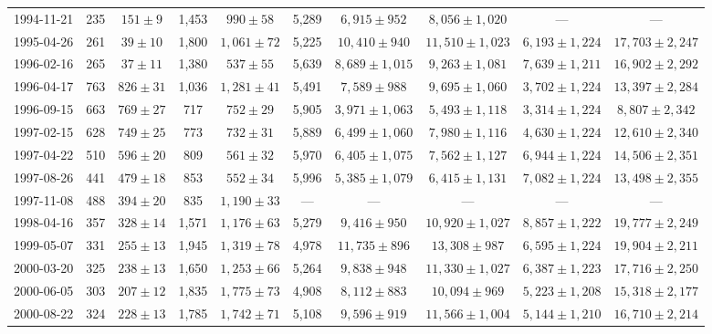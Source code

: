 \begin{landscape}
\begin{longtable}{cccccccccc}
{1994-11-21} & 235 & {$151  \pm  9$} & 1,453 & {$990 \pm 58$} & 5,289 & {$6,915 \pm 952$} & {$8,056 \pm 1,020$} & --- & --- \\
{1995-04-26} & 261 & {$39  \pm  10$} & 1,800 & {$1,061 \pm 72$} & 5,225 & {$10,410 \pm 940$} & {$11,510 \pm 1,023$} & {$6,193 \pm 1,224$} & {$17,703 \pm 2,247$} \\
{1996-02-16} & 265 & {$37  \pm  11$} & 1,380 & {$537 \pm 55$} & 5,639 & {$8,689 \pm 1,015$} & {$9,263 \pm 1,081$} & {$7,639 \pm 1,211$} & {$16,902 \pm 2,292$} \\
{1996-04-17} & 763 & {$826  \pm  31$} & 1,036 & {$1,281 \pm 41$} & 5,491 & {$7,589 \pm 988$} & {$9,695 \pm 1,060$} & {$3,702 \pm 1,224$} & {$13,397 \pm 2,284$} \\
{1996-09-15} & 663 & {$769  \pm  27$} & 717 & {$752 \pm 29$} & 5,905 & {$3,971 \pm 1,063$} & {$5,493 \pm 1,118$} & {$3,314 \pm 1,224$} & {$8,807 \pm 2,342$} \\
{1997-02-15} & 628 & {$749  \pm  25$} & 773 & {$732 \pm 31$} & 5,889 & {$6,499 \pm 1,060$} & {$7,980 \pm 1,116$} & {$4,630 \pm 1,224$} & {$12,610 \pm 2,340$} \\
{1997-04-22} & 510 & {$596  \pm  20$} & 809 & {$561 \pm 32$} & 5,970 & {$6,405 \pm 1,075$} & {$7,562 \pm 1,127$} & {$6,944 \pm 1,224$} & {$14,506 \pm 2,351$} \\
{1997-08-26} & 441 & {$479  \pm  18$} & 853 & {$552 \pm 34$} & 5,996 & {$5,385 \pm 1,079$} & {$6,415 \pm 1,131$} & {$7,082 \pm 1,224$} & {$13,498 \pm 2,355$} \\
{1997-11-08} & 488 & {$394  \pm  20$} & 835 & {$1,190 \pm 33$} & --- & --- & --- & --- & --- \\
{1998-04-16} & 357 & {$328  \pm  14$} & 1,571 & {$1,176 \pm 63$} & 5,279 & {$9,416 \pm 950$} & {$10,920 \pm 1,027$} & {$8,857 \pm 1,222$} & {$19,777 \pm 2,249$} \\
{1999-05-07} & 331 & {$255  \pm  13$} & 1,945 & {$1,319 \pm 78$} & 4,978 & {$11,735 \pm 896$} & {$13,308 \pm 987$} & {$6,595 \pm 1,224$} & {$19,904 \pm 2,211$} \\
{2000-03-20} & 325 & {$238  \pm  13$} & 1,650 & {$1,253 \pm 66$} & 5,264 & {$9,838 \pm 948$} & {$11,330 \pm 1,027$} & {$6,387 \pm 1,223$} & {$17,716 \pm 2,250$} \\
{2000-06-05} & 303 & {$207  \pm  12$} & 1,835 & {$1,775 \pm 73$} & 4,908 & {$8,112 \pm 883$} & {$10,094 \pm 969$} & {$5,223 \pm 1,208$} & {$15,318 \pm 2,177$} \\
{2000-08-22} & 324 & {$228  \pm  13$} & 1,785 & {$1,742 \pm 71$} & 5,108 & {$9,596 \pm 919$} & {$11,566 \pm 1,004$} & {$5,144 \pm 1,210$} & {$16,710 \pm 2,214$} \\

\end{longtable}
\end{landscape}
